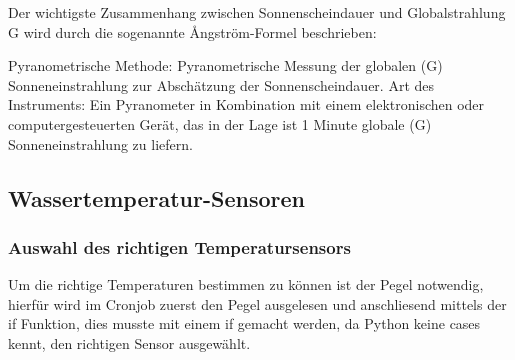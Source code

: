 Der wichtigste Zusammenhang zwischen Sonnenscheindauer und Globalstrahlung G wird durch die sogenannte Ångström-Formel beschrieben:

Pyranometrische Methode: Pyranometrische Messung der globalen (G) Sonneneinstrahlung zur Abschätzung der Sonnenscheindauer. Art des Instruments: Ein Pyranometer in Kombination mit einem elektronischen oder computergesteuerten Gerät, das in der Lage ist 1 Minute globale (G) Sonneneinstrahlung zu liefern.





\subsection{Wassertemperatur-Sensoren}

\subsubsection{Auswahl des richtigen Temperatursensors}
Um die richtige Temperaturen bestimmen zu können ist der Pegel notwendig, hierfür wird im Cronjob zuerst den Pegel ausgelesen und anschliesend mittels der if Funktion, dies musste mit einem if gemacht werden, da Python keine cases kennt, den richtigen Sensor ausgewählt.

